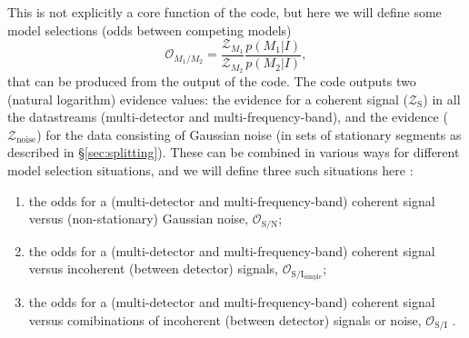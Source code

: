This is not explicitly a core function of the code, but here we will define some model selections (odds between competing models)
\begin{equation}
 \mathcal{O}_{M_1/M_2} = \frac{\mathcal{Z}_{M_1}}{\mathcal{Z}_{M_2}}\frac{p(M_1|I)}{p(M_2|I)},
\end{equation}
that can be produced from the output of the code. The code outputs two (natural logarithm) evidence values: the evidence for a coherent signal
($\mathcal{Z}_{\text{S}}$)
in all the datastreams (multi-detector and multi-frequency-band), and the evidence ($\mathcal{Z}_{\text{noise}}$) for the data consisting of
Gaussian noise (in sets of stationary segments as described in \S\ref{sec:splitting}). These can be combined in various ways for different model
selection situations, and we will define three such situations here \citep[see e.g.][for two of these]{2017arXiv170107709T}:
\begin{enumerate}
 \item the odds for a (multi-detector and multi-frequency-band) coherent signal versus (non-stationary) Gaussian noise, $\mathcal{O}_{\text{S}/\text{N}}$;
 \item the odds for a (multi-detector and multi-frequency-band) coherent signal versus incoherent (between detector) signals, $\mathcal{O}_{\text{S}/\text{I}_{\text{simple}}}$;
 \item the odds for a (multi-detector and multi-frequency-band) coherent signal versus comibinations of incoherent (between detector) signals or noise,
 $\mathcal{O}_{\text{S}/\text{I}}$ \citep[cf.\ Equation~A6 in][]{2017arXiv170107709T}.
\end{enumerate}

